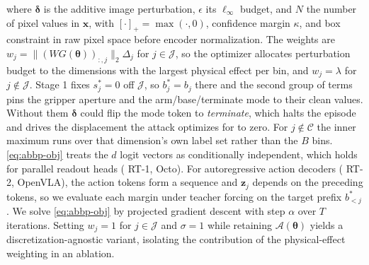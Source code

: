 where $\bm{\delta}$ is the additive image perturbation, $\epsilon$ its $\ell_{\infty}$ budget, and $N$ the number of pixel values in $\bm{x}$, with $[\cdot]_{+}=\max(\cdot,0)$, confidence margin $\kappa$, and box constraint in raw pixel space before encoder normalization. The weights are $w_j=\|(WG(\bm{\theta}))_{:,j}\|_{2}\Delta_j$ for $j\in\mathcal{J}$, so the optimizer allocates perturbation budget to the dimensions with the largest physical effect per bin, and $w_j=\lambda$ for $j\notin\mathcal{J}$. Stage 1 fixes $s_j^{*}{=}0$ off $\mathcal{J}$, so $b_j^{*}{=}b_j$ there and the second group of terms pins the gripper aperture and the arm/base/terminate mode to their clean values. Without them $\bm{\delta}$ could flip the mode token to \emph{terminate}, which halts the episode and drives the displacement the attack optimizes for to zero. For $j\notin\mathcal{C}$ the inner maximum runs over that dimension's own label set rather than the $B$ bins. \autoref{eq:abbp-obj} treats the $d$ logit vectors as conditionally independent, which holds for parallel readout heads ({\eg} RT-1, Octo). For autoregressive action decoders ({\eg} RT-2, OpenVLA), the action tokens form a sequence and $\bm{z}_j$ depends on the preceding tokens, so we evaluate each margin under teacher forcing on the target prefix $b^{*}_{<j}$. We solve \autoref{eq:abbp-obj} by projected gradient descent with step $\alpha$ over $T$ iterations. Setting $w_j{=}1$ for $j\in\mathcal{J}$ and $\sigma{=}1$ while retaining $\mathcal{A}(\bm{\theta})$ yields a discretization-agnostic variant, isolating the contribution of the physical-effect weighting in an ablation.


